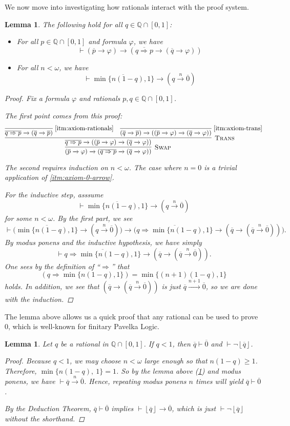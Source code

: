 \documentclass{amsart}
\newtheorem{lemma}[theorem]{Lemma}
\theoremstyle{definition}
\numberwithin{equation}{theorem}
\renewcommand{\phi}{\varphi}
\newcommand{\Q}{\mathbb{Q}}
\newcommand{\proves}{\vdash}
\newcommand{\strict}[1]{{\left\lfloor#1\right\rfloor}}
\newcommand{\rat}[1]{{\overline{#1}}}
\newcommand{\narrow}[1]{\xrightarrow{#1}}
\renewcommand{\to}{\narrow{}}
\newcommand{\trans}{\text{\sc{Trans}}}
\newcommand{\aref}[1]{\!\text{\ref{itm:axiom-#1}}}
\newcommand{\swap}{\text{\sc{Swap}}}
\begin{document}
We now move into investigating how rationals interact with the proof system.
\begin{lemma}\label{lem:rationals-basic}
	The following hold for all $q\in\Q\cap[0,1]$:
  \begin{itemize}
  \item For all $p\in\Q\cap[0,1]$ and formula $\phi$, we have
	  \[
	    \proves(\rat p\to\phi)\to(\rat{q\Rightarrow p}\to(\rat q\to\phi))
	  \]
  \item For all $n<\omega$, we have
	  \[
	    \proves\rat{\min\{n(1-q),1\}}\to(q\narrow n\rat 0)
	  \]
  \end{itemize}
  \begin{proof}
    Fix a formula $\phi$ and rationals $p,q\in\Q\cap[0,1]$.
  
    The first point comes from this proof:
    \[
      \infer[\swap]{(\rat p\to\phi)\to(\rat{q\Rightarrow p}\to(\rat q\to\phi))}{
        \infer[\trans]{\rat{q\Rightarrow p}\to((\rat p\to\phi)\to(\rat q\to\phi))}{
          \infer[\aref{rationals}]{\rat{q\Rightarrow p}\to(\rat q\to\rat p)}{} &
          \infer[\aref{trans}]{(\rat q\to\rat p)\to((\rat p\to\phi)\to(\rat q\to\phi))}{}
        }
      }
    \]
    
    The second requires induction on $n<\omega$.
    The case where $n=0$ is a trivial application of \ref{itm:axiom-0-arrow}.
    
    For the inductive step, asssume
    \[
      \proves\rat{\min\{n(1-q),1\}}\to(q\narrow n\rat 0)
    \]
    for some $n<\omega$.
    By the first part, we see
    \[
      \proves\Big(\rat{\min\{n(1-q),1\}}\to(q\narrow n\rat 0)\Big)\to\Big(\rat{q\Rightarrow\min\{n(1-q),1\}}\to(\rat q\rightarrow(\rat q\narrow n\rat 0))\Big).
    \]
    By modus ponens and the inductive hypothesis, we have simply
    \[
      \proves\rat{q\Rightarrow\min\{n(1-q),1\}}\to(\rat q\rightarrow(\rat q\narrow n\rat 0)).
    \]
    One sees by the definition of ``$\Rightarrow$'' that
    \[
      (q\Rightarrow\min\{n(1-q),1\})=\min\{(n+1)(1-q), 1\}
    \]
    holds.
    In addition, we see that $(\rat q\to(\rat q\narrow n\rat 0))$ is just $\rat q\narrow{n+1}\rat 0$, so we are done with the induction.
  \end{proof}
\end{lemma}
The lemma above allows us a quick proof that any rational can be used to prove 0, which is well-known for finitary Pavelka Logic.
\begin{lemma}
  Let $q$ be a rational in $\Q\cap[0,1]$.
  If $q<1$, then $\rat q\proves\rat 0$ and $\proves\neg\strict{\rat q}$.
  \begin{proof}
    Because $q<1$, we may choose $n<\omega$ large enough so that $n(1-q)\geq 1$.
    Therefore, $\min\{n(1-q),\ 1\}=1$.
    So by the lemma above (\ref{lem:rationals-basic}) and modus ponens, we have $\proves\rat q\narrow n\rat 0$.
    Hence, repeating modus ponens $n$ times will yield $\rat q\proves\rat 0$.
    
    By the Deduction Theorem, $\rat q\proves\rat 0$ implies $\proves\strict{\rat q}\to\rat 0$, which is just $\proves\neg\strict{\rat q}$ without the shorthand.
  \end{proof}
\end{lemma}
\end{document}
